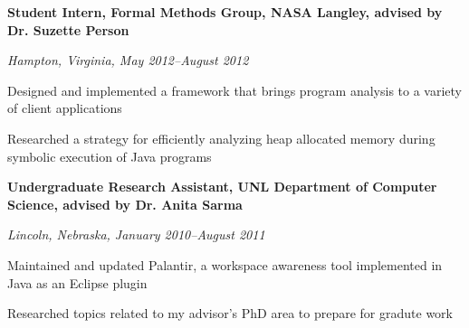 \documentclass[10pt,letterpaper]{article}
\renewenvironment{itemize}{
  \begin{list}{}{
    \setlength{\leftmargin}{1.5em}
    \setlength{\itemsep}{0.25em}
    \setlength{\parskip}{0pt}
    \setlength{\parsep}{0.25em}
  }
}{
  \end{list}
}
\begin{document}
\begin{comment}
\begin{itemize}
\item \textbf{Host and Fellowship Coordinator, August 2012--July 2013}
\item \emph{Lutheran Student Center (ELCA), University of Nebraska-Lincoln}
    \begin{itemize}
    \item Clean and maintain the Lutheran Student Center building
    \item Engage students with fun fellowship opportunities such as movie nights and pool leagues
    \end{itemize}
\end{itemize}
\end{comment}

\begin{itemize}
\item \textbf{Student Intern, Formal Methods Group, NASA Langley, advised by Dr. Suzette Person}
\item \emph{Hampton, Virginia, May 2012--August 2012}
    \begin{itemize}
    \item Designed and implemented a framework that brings program analysis to a variety of client applications
    \item Researched a strategy for efficiently analyzing heap allocated memory during symbolic execution of Java programs
    \end{itemize}
\end{itemize}

\begin{comment}
\begin{itemize}
\item \textbf{Teaching Assistant for CSE361 (Software Engineering), August 2011--December 2011}
\item \emph{University of Nebraska-Lincoln, Department of Computer Science}
	\begin{itemize}
    \item Developed a semester project, assisted in class, graded assignments
	\end{itemize}
\end{itemize}
\end{comment}

\begin{itemize}
\item \textbf{Undergraduate Research Assistant, UNL Department of Computer Science, advised by Dr. Anita Sarma}
\item \emph{Lincoln, Nebraska, January 2010--August 2011}
	\begin{itemize}
    \item Maintained and updated Palantir, a workspace awareness tool implemented in Java as an Eclipse plugin
    \item Researched topics related to my advisor's PhD area to prepare for gradute work
	\end{itemize}
\end{itemize}
\end{document}

